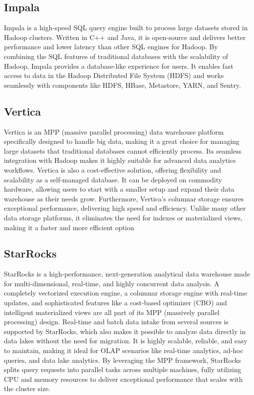     \subsection{Impala}
    Impala is a high-speed SQL query engine built to process large datasets stored in Hadoop clusters. Written in C++ and Java, it is open-source and delivers better performance and lower latency than other SQL engines for Hadoop. By combining the SQL features of traditional databases with the scalability of Hadoop, Impala provides a database-like experience for users. It enables fast access to data in the Hadoop Distributed File System (HDFS) and works seamlessly with components like HDFS, HBase, Metastore, YARN, and Sentry.
    \cite{Tutorialspoint}
    \subsection{Vertica}
    Vertica is an MPP (massive parallel processing) data warehouse platform specifically designed to handle big data, making it a great choice for managing large datasets that traditional databases cannot efficiently process. Its seamless integration with Hadoop makes it highly suitable for advanced data analytics workflows. Vertica is also a cost-effective solution, offering flexibility and scalability as a self-managed database. It can be deployed on commodity hardware, allowing users to start with a smaller setup and expand their data warehouse as their needs grow. Furthermore, Vertica's columnar storage ensures exceptional performance, delivering high speed and efficiency. Unlike many other data storage platforms, it eliminates the need for indexes or materialized views, making it a faster and more efficient option
    \cite{Tobin}
\pagebreak
    \subsection{StarRocks}
    StarRocks is a high-performance, next-generation analytical data warehouse made for multi-dimensional, real-time, and highly concurrent data analysis. A completely vectorized execution engine, a columnar storage engine with real-time updates, and sophisticated features like a cost-based optimizer (CBO) and intelligent materialized views are all part of its MPP (massively parallel processing) design. Real-time and batch data intake from several sources is supported by StarRocks, which also makes it possible to analyze data directly in data lakes without the need for migration.  It is highly scalable, reliable, and easy to maintain, making it ideal for OLAP scenarios like real-time analytics, ad-hoc queries, and data lake analytics. By leveraging the MPP framework, StarRocks splits query requests into parallel tasks across multiple machines, fully utilizing CPU and memory resources to deliver exceptional performance that scales with the cluster size.
    \cite{StarRocks}
